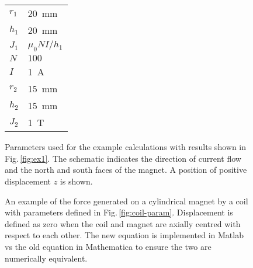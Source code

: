 \begin{figure}
\centering
\hspace{-4cm}\hspace{-2cm}%
  \begin{tabular}[b]{@{}ll@{}}
  \toprule
  $r_1$ &   \SI{20}{mm} \\
  $h_1$ &   \SI{20}{mm} \\
  $J_1$ & $\mu_0NI/h_1$ \\
  $N$ & $100$ \\
  $I$ & \SI{1}{A} \\
  \midrule
  $r_2$ & \SI{15}{mm} \\
  $h_2$ & \SI{15}{mm} \\
  $J_2$ & \SI{1}{T}\\
  \bottomrule
  \end{tabular}
\caption{Parameters used for the example calculations with results shown in Fig.\,\ref{fig:ex1}. The schematic indicates the direction of current flow and the north and south faces of the magnet. A position of positive displacement $z$ is shown.}
\end{figure}


\begin{figure}
  \centering
  \caption{An example of the force generated on a cylindrical magnet by a coil with parameters defined in Fig.\,\ref{fig:coil-param}. Displacement is defined as zero when the coil and magnet are axially centred with respect to each other. The new equation is implemented in Matlab vs the old equation in Mathematica to ensure the two are numerically equivalent.}
\end{figure}


